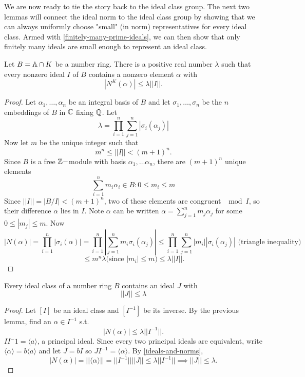 We are now ready to tie the story back to the ideal class group. The next two lemmas will connect the ideal norm to the ideal class group by showing that we can always uniformly choose "small" (in norm) representatives for every ideal class. Armed with \cref{finitely-many-prime-ideals}, we can then show that only finitely many ideals are small enough to represent an ideal class.
\begin{lemma}
Let $B=\mathbb{A}\cap K$ be a number ring. There is a positive real number $\lambda$ such that every nonzero ideal $I$ of $B$ contains a nonzero element $\alpha$ with
$$|N^K(\alpha)|\leq \lambda ||I||.$$
\end{lemma}
\begin{proof}
Let $\alpha_1,\dots, \alpha_n$ be an integral basis of $B$ and let $\sigma_1,\dots,\sigma_n$ be the $n$ embeddings of $B$ in $\mathbb{C}$ fixing $\mathbb{Q}$. Let
$$\lambda=\prod_{i=1}^n\sum_{j=1}^n|\sigma_i(\alpha_j)|$$
Now let $m$ be the unique integer such that $$m^n\leq ||I||< (m+1)^n.$$ Since $B$ is a free $\mathbb{Z}-$module with basis $\alpha_1,\dots \alpha_n$, there are $(m+1)^n$ unique elements
$$\sum_{i=1}^n m_i\alpha_i \in B :0\leq m_i\leq m$$
Since $||I||=|B/I|<(m+1)^n$, two of these elements are congruent $\mod I$, so their difference $\alpha$ lies in $I$. Note $\alpha$ can be written
$\alpha=\sum_{j=1}^nm_j\alpha_j$ for some $0\leq |m_j|\leq m$.
Now $$|N(\alpha)|=\prod_{i=1}^n |\sigma_i(\alpha)|=\prod_{i=1}^n |\sum_{j=1}^nm_i\sigma_i(\alpha_j)|\leq \prod_{i=1}^n \sum_{j=1}^n|m_i||\sigma_i(\alpha_j)| \text{ (triangle inequality)}$$
$$\leq m^n\lambda \text{(since }|m_i|\leq m\text{)} \leq \lambda||I||.$$
\cite{NumberFields}
\end{proof}

\begin{lemma}
Every ideal class of a number ring $B$ contains an ideal $J$ with
$$||J||\leq \lambda$$
\end{lemma}
\begin{proof}
Let $[I]$ be an ideal class and $[I^{-1}]$ be its inverse. By the previous lemma, find an $\alpha\in I^{-1}$ s.t. $$|N(\alpha)|\leq \lambda ||I^{-1}||.$$ $II{^-1}=\langle a \rangle$, a principal ideal. Since every two principal ideals are equivalent, write $\langle \alpha \rangle =b\langle a \rangle$ and let $J=bI$ so $JI^{-1}=\langle \alpha \rangle$. By \cref{ideals-and-norms},
$$|N(\alpha)|=||\langle \alpha \rangle||=||I^{-1}|| ||J||\leq \lambda ||I^{-1}||\implies ||J||\leq \lambda.$$\cite{NumberFields}
\end{proof}

